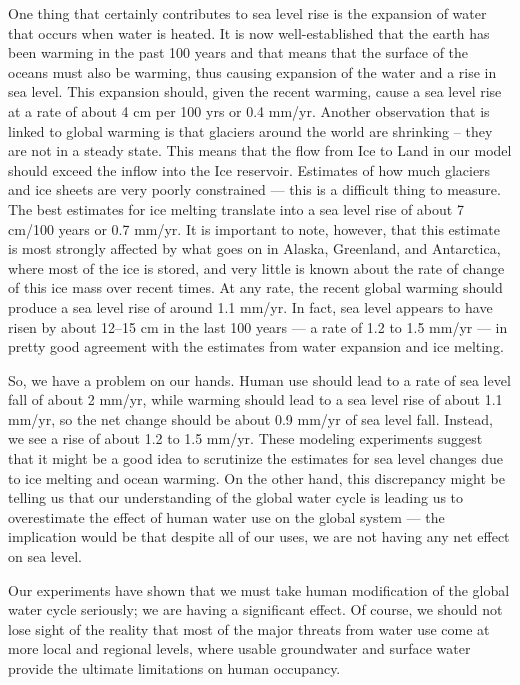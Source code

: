 \documentclass[11pt,letterpaper]{article}
\begin{document}
One thing that certainly contributes to sea level rise is the expansion of water that occurs when water is heated. It is now well-established that the earth has been warming in the past 100 years and that means that the surface of the oceans must also be warming, thus causing expansion of the water and a rise in sea level. This expansion should, given the recent warming, cause a sea level rise at a rate of about 4 cm per 100 yrs or 0.4 mm/yr. Another observation that is linked to global warming is that glaciers around the world are shrinking -- they are not in a steady state. This means that the flow from Ice to Land in our model should exceed the inflow into the Ice reservoir. Estimates of how much glaciers and ice sheets are very poorly constrained --- this is a difficult thing to measure. The best estimates for ice melting translate into a sea level rise of about 7 cm/100 years or 0.7 mm/yr. It is important to note, however, that this estimate is most strongly affected by what goes on in Alaska, Greenland, and Antarctica, where most of the ice is stored, and very little is known about the rate of change of this ice mass over recent times. At any rate, the recent global warming should produce a sea level rise of around 1.1 mm/yr. In fact, sea level appears to have risen by about 12--15 cm in the last 100 years --- a rate of 1.2 to 1.5 mm/yr --- in pretty good agreement with the estimates from water expansion and ice melting.

So, we have a problem on our hands. Human use should lead to a rate of sea level fall of about 2 mm/yr, while warming should lead to a sea level rise of about 1.1 mm/yr, so the net change should be about 0.9 mm/yr of sea level fall. Instead, we see a rise of about 1.2 to 1.5 mm/yr. These modeling experiments suggest that it might be a good idea to scrutinize the estimates for sea level changes due to ice melting and ocean warming. On the other hand, this discrepancy might be telling us that our understanding of the global water cycle is leading us to overestimate the effect of human water use on the global system --- the implication would be that despite all of our uses, we are not having any net effect on sea level.

Our experiments have shown that we must take human modification of the global water cycle seriously; we are having a significant effect. Of course, we should not lose sight of the reality that most of the major threats from water use come at more local and regional levels, where usable groundwater and surface water provide the ultimate limitations on human occupancy.
\end{document}
